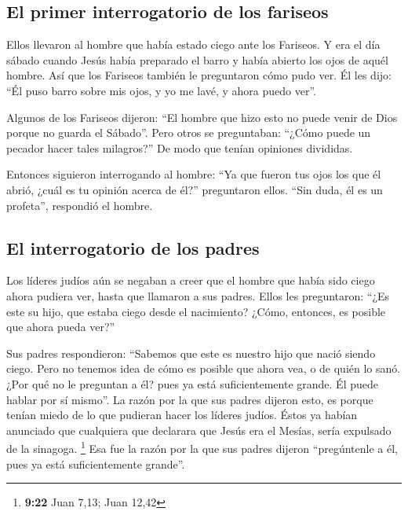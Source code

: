 \hypertarget{el-primer-interrogatorio-de-los-fariseos}{%
\subsection{El primer interrogatorio de los
fariseos}\label{el-primer-interrogatorio-de-los-fariseos}}

 Ellos llevaron al hombre que había estado ciego ante los
Fariseos.  Y era el día sábado cuando Jesús había
preparado el barro y había abierto los ojos de aquél hombre.
 Así que los Fariseos también le preguntaron cómo pudo
ver. Él les dijo: ``Él puso barro sobre mis ojos, y yo me lavé, y ahora
puedo ver''.

 Algunos de los Fariseos dijeron: ``El hombre que hizo
esto no puede venir de Dios porque no guarda el Sábado''. Pero otros se
preguntaban: ``¿Cómo puede un pecador hacer tales milagros?'' De modo
que tenían opiniones divididas.

 Entonces siguieron interrogando al hombre: ``Ya que
fueron tus ojos los que él abrió, ¿cuál es tu opinión acerca de él?''
preguntaron ellos. ``Sin duda, él es un profeta'', respondió el hombre.

\hypertarget{el-interrogatorio-de-los-padres}{%
\subsection{El interrogatorio de los
padres}\label{el-interrogatorio-de-los-padres}}

 Los líderes judíos aún se negaban a creer que el hombre
que había sido ciego ahora pudiera ver, hasta que llamaron a sus padres.
 Ellos les preguntaron: ``¿Es este su hijo, que estaba
ciego desde el nacimiento? ¿Cómo, entonces, es posible que ahora pueda
ver?''

 Sus padres respondieron: ``Sabemos que este es nuestro
hijo que nació siendo ciego.  Pero no tenemos idea de
cómo es posible que ahora vea, o de quién lo sanó. ¿Por qué no le
preguntan a él? pues ya está suficientemente grande. Él puede hablar por
sí mismo''.  La razón por la que sus padres dijeron esto,
es porque tenían miedo de lo que pudieran hacer los líderes judíos.
Éstos ya habían anunciado que cualquiera que declarara que Jesús era el
Mesías, sería expulsado de la sinagoga. \footnote{\textbf{9:22} Juan
  7,13; Juan 12,42}  Esa fue la razón por la que sus
padres dijeron ``pregúntenle a él, pues ya está suficientemente
grande''.

